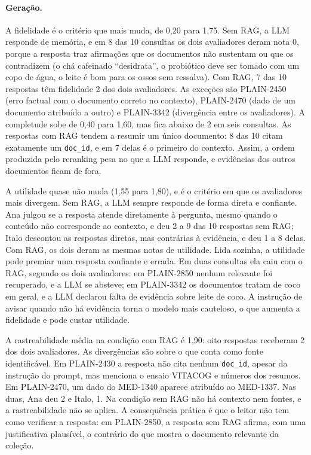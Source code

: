 \documentclass[11pt,a4paper]{article}
\newcommand{\cod}[1]{\texttt{#1}}
\begin{document}
\paragraph{Geração.} A fidelidade é o critério que mais muda, de 0,20 para 1,75. Sem RAG, a LLM responde de memória, e em 8 das 10 consultas os dois avaliadores deram nota 0, porque a resposta traz afirmações que os documentos não sustentam ou que os contradizem (o chá cafeinado ``desidrata'', o probiótico deve ser tomado com um copo de água, o leite é bom para os ossos sem ressalva). Com RAG, 7 das 10 respostas têm fidelidade 2 dos dois avaliadores. As exceções são PLAIN-2450 (erro factual com o documento correto no contexto), PLAIN-2470 (dado de um documento atribuído a outro) e PLAIN-3342 (divergência entre os avaliadores). A completude sobe de 0,40 para 1,60, mas fica abaixo de 2 em seis consultas. As respostas com RAG tendem a resumir um único documento: 8 das 10 citam exatamente um \cod{doc\_id}, e em 7 delas é o primeiro do contexto. Assim, a ordem produzida pelo reranking pesa no que a LLM responde, e evidências dos outros documentos ficam de fora.

A utilidade quase não muda (1,55 para 1,80), e é o critério em que os avaliadores mais divergem. Sem RAG, a LLM sempre responde de forma direta e confiante. Ana julgou se a resposta atende diretamente à pergunta, mesmo quando o conteúdo não corresponde ao contexto, e deu 2 a 9 das 10 respostas sem RAG; Italo descontou as respostas diretas, mas contrárias à evidência, e deu 1 a 8 delas. Com RAG, os dois deram as mesmas notas de utilidade. Lida sozinha, a utilidade pode premiar uma resposta confiante e errada. Em duas consultas ela caiu com o RAG, segundo os dois avaliadores: em PLAIN-2850 nenhum relevante foi recuperado, e a LLM se absteve; em PLAIN-3342 os documentos tratam de coco em geral, e a LLM declarou falta de evidência sobre leite de coco. A instrução de avisar quando não há evidência torna o modelo mais cauteloso, o que aumenta a fidelidade e pode custar utilidade.

A rastreabilidade média na condição com RAG é 1,90: oito respostas receberam 2 dos dois avaliadores. As divergências são sobre o que conta como fonte identificável. Em PLAIN-2430 a resposta não cita nenhum \cod{doc\_id}, apesar da instrução do prompt, mas menciona o ensaio VITACOG e números dos resumos. Em PLAIN-2470, um dado do MED-1340 aparece atribuído ao MED-1337. Nas duas, Ana deu 2 e Italo, 1. Na condição sem RAG não há contexto nem fontes, e a rastreabilidade não se aplica. A consequência prática é que o leitor não tem como verificar a resposta: em PLAIN-2850, a resposta sem RAG afirma, com uma justificativa plausível, o contrário do que mostra o documento relevante da coleção.
\end{document}
